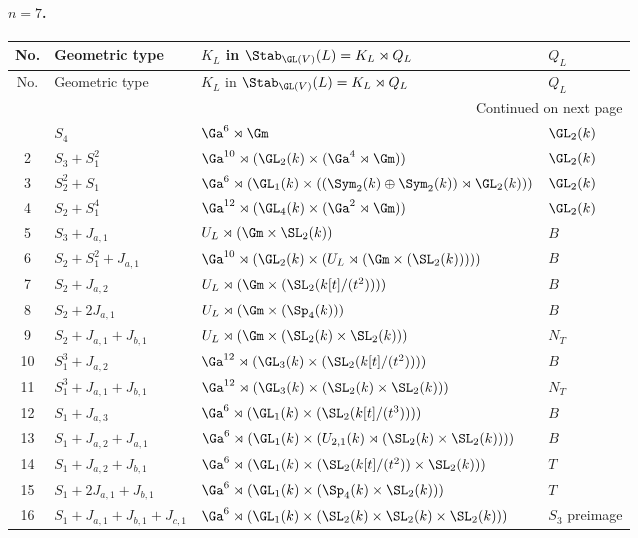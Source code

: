 \paragraph{$n=7$.}
\begin{longtable}{@{}c p{} p{} p{}@{}}
\toprule
No. & Geometric type & $K_L$ in $\Stab_{\GL(V)}(L)=K_L\rtimes Q_L$ & $Q_L$ \\
\midrule
\endfirsthead
\toprule
No. & Geometric type & $K_L$ in $\Stab_{\GL(V)}(L)=K_L\rtimes Q_L$ & $Q_L$ \\
\midrule
\endhead
\midrule
\multicolumn{4}{r}{Continued on next page}\\
\midrule
\endfoot
\bottomrule
\endlastfoot
1 & $S_4$ & $\Ga^{6}\rtimes \Gm$ & $\GL_2(k)$ \\
2 & $S_3 + S_1^2$ & $\Ga^{10}\rtimes (\GL_2(k)\times (\Ga^{4}\rtimes \Gm))$ & $\GL_2(k)$ \\
3 & $S_2^2 + S_1$ & $\Ga^{6}\rtimes (\GL_1(k)\times ((\Sym_2(k)\oplus \Sym_2(k))\rtimes \GL_2(k)))$ & $\GL_2(k)$ \\
4 & $S_2 + S_1^4$ & $\Ga^{12}\rtimes (\GL_4(k)\times (\Ga^{2}\rtimes \Gm))$ & $\GL_2(k)$ \\
5 & $S_3 + J_{a,1}$ & $U_L\rtimes (\Gm\times \SL_2(k))$ & $B$ \\
6 & $S_2 + S_1^2 + J_{a,1}$ & $\Ga^{10}\rtimes (\GL_2(k)\times (U_L\rtimes (\Gm\times (\SL_2(k)))))$ & $B$ \\
7 & $S_2 + J_{a,2}$ & $U_L\rtimes (\Gm\times (\SL_2(k[t]/(t^2))))$ & $B$ \\
8 & $S_2 + 2J_{a,1}$ & $U_L\rtimes (\Gm\times (\Sp_4(k)))$ & $B$ \\
9 & $S_2 + J_{a,1} + J_{b,1}$ & $U_L\rtimes (\Gm\times (\SL_2(k)\times \SL_2(k)))$ & $N_T$ \\
10 & $S_1^3 + J_{a,2}$ & $\Ga^{12}\rtimes (\GL_3(k)\times (\SL_2(k[t]/(t^2))))$ & $B$ \\
11 & $S_1^3 + J_{a,1} + J_{b,1}$ & $\Ga^{12}\rtimes (\GL_3(k)\times (\SL_2(k)\times \SL_2(k)))$ & $N_T$ \\
12 & $S_1 + J_{a,3}$ & $\Ga^{6}\rtimes (\GL_1(k)\times (\SL_2(k[t]/(t^3))))$ & $B$ \\
13 & $S_1 + J_{a,2} + J_{a,1}$ & $\Ga^{6}\rtimes (\GL_1(k)\times (U_{2,1}(k)\rtimes (\SL_2(k)\times \SL_2(k))))$ & $B$ \\
14 & $S_1 + J_{a,2} + J_{b,1}$ & $\Ga^{6}\rtimes (\GL_1(k)\times (\SL_2(k[t]/(t^2))\times \SL_2(k)))$ & $T$ \\
15 & $S_1 + 2J_{a,1} + J_{b,1}$ & $\Ga^{6}\rtimes (\GL_1(k)\times (\Sp_4(k)\times \SL_2(k)))$ & $T$ \\
16 & $S_1 + J_{a,1} + J_{b,1} + J_{c,1}$ & $\Ga^{6}\rtimes (\GL_1(k)\times (\SL_2(k)\times \SL_2(k)\times \SL_2(k)))$ & $S_3$ preimage \\
\end{longtable}

